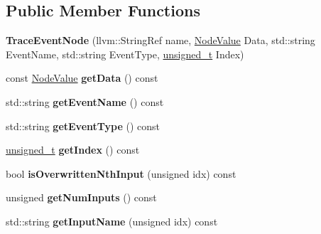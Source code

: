 \subsection*{Public Member Functions}
\begin{DoxyCompactItemize}
\item 
\mbox{\label{classglow_1_1_trace_event_node_a943c657dc6a3518f60e16477f3ab811e}} 
{\bfseries Trace\+Event\+Node} (llvm\+::\+String\+Ref name, \hyperlink{structglow_1_1_node_value}{Node\+Value} Data, std\+::string Event\+Name, std\+::string Event\+Type, \hyperlink{namespaceglow_a0ca574644e1e42ef193a9947fb4d8911}{unsigned\+\_\+t} Index)
\item 
\mbox{\label{classglow_1_1_trace_event_node_a868f3bf1afe46858fd93498b28ad25b2}} 
const \hyperlink{structglow_1_1_node_value}{Node\+Value} {\bfseries get\+Data} () const
\item 
\mbox{\label{classglow_1_1_trace_event_node_af7baf57e71a312976e20f2f2c39bd25c}} 
std\+::string {\bfseries get\+Event\+Name} () const
\item 
\mbox{\label{classglow_1_1_trace_event_node_a030c1075f4c6903bd067e373ded8d5e8}} 
std\+::string {\bfseries get\+Event\+Type} () const
\item 
\mbox{\label{classglow_1_1_trace_event_node_acd513ddbe5d18d98b1a61ca5540ce4e2}} 
\hyperlink{namespaceglow_a0ca574644e1e42ef193a9947fb4d8911}{unsigned\+\_\+t} {\bfseries get\+Index} () const
\item 
\mbox{\label{classglow_1_1_trace_event_node_a805cbb4a47b506d690df36bf198bb413}} 
bool {\bfseries is\+Overwritten\+Nth\+Input} (unsigned idx) const
\item 
\mbox{\label{classglow_1_1_trace_event_node_ac8bdb5f0addf80edd8a31a6cede6b36c}} 
unsigned {\bfseries get\+Num\+Inputs} () const
\item 
\mbox{\label{classglow_1_1_trace_event_node_aa131dde42999e98f3c62fd190b724681}} 
std\+::string {\bfseries get\+Input\+Name} (unsigned idx) const

\end{DoxyCompactItemize}
